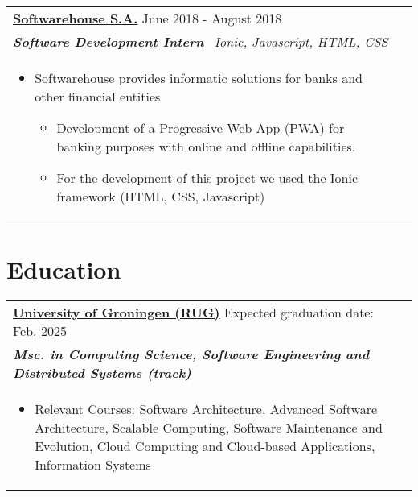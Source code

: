 \documentclass[a4paper,8pt]{article}
\begin{document}
\begin{tabularx}{\linewidth}{ @{}l r@{} }
\textbf{\uline{\href{https://www.fit-bank.com/}{Softwarehouse S.A.}}} \hfill \color[HTML]{371e77} June 2018 - August 2018 \\[4pt]
\color[HTML]{371e77}\textbf{\textit{Software Development Intern}}\ \hfill \color[HTML]{4B28A4} \textit{Ionic, Javascript, HTML, CSS} \\[5pt]
\begin{minipage}[t]{\linewidth}
    \begin{itemize}[nosep,after=\strut, leftmargin=2em, itemsep=2pt]
        \item Softwarehouse provides informatic solutions for banks and other financial entities
        \begin{itemize}
            \item Development of a Progressive Web App (PWA) for banking purposes with online and offline capabilities.
            \item For the development of this project we used the Ionic framework (HTML, CSS, Javascript)
        \end{itemize}
    \end{itemize}
\end{minipage}
\end{tabularx}


\section{Education}

\begin{tabularx}{\linewidth}{ @{}l r@{} }
\color[HTML]{1C033C} \textbf{\uline{University of Groningen (RUG)}} \hfill  \color[HTML]{371e77} Expected graduation date: Feb. 2025 \\[4pt]
\color[HTML]{371e77}\textbf{\textit{Msc. in Computing Science, Software Engineering and Distributed Systems (track)}}\ \hfill \color[HTML]{4B28A4} \\[5pt]
\begin{minipage}[t]{\linewidth}
    \begin{itemize}[nosep,after=\strut, leftmargin=2em, itemsep=2pt]
        \item Relevant Courses: Software Architecture, Advanced Software Architecture, Scalable Computing, Software Maintenance and Evolution, Cloud Computing and Cloud-based Applications, Information Systems
    \end{itemize}
\end{minipage}
\end{tabularx}
\end{document}
